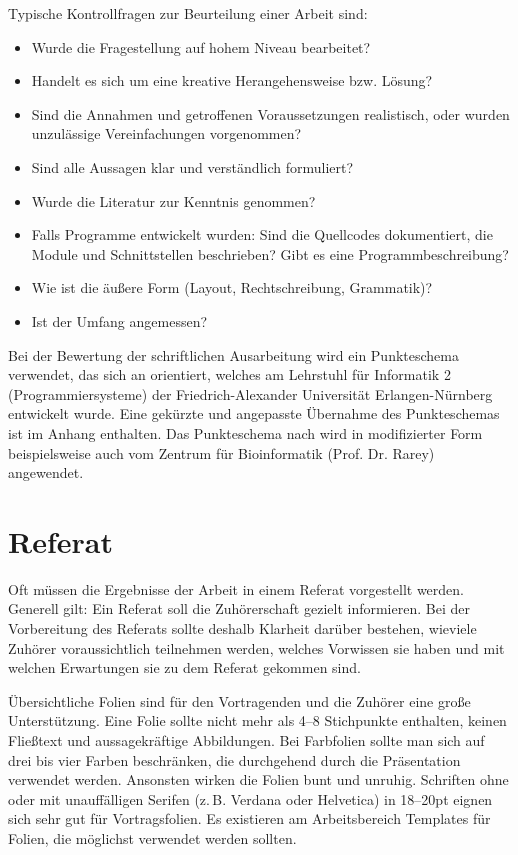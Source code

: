 \documentclass[
    fontsize=12pt,
    headings=small,
    parskip=half,           %
    bibliography=totoc,
    numbers=noenddot,       %
    open=any,               %
    ]{scrreprt}
\begin{document}
Typische Kontrollfragen zur Beurteilung einer Arbeit sind:
\begin{itemize}
	\item Wurde die Fragestellung auf hohem Niveau bearbeitet?
	\item Handelt es sich um eine kreative Herangehensweise bzw. Lösung?
	\item Sind die Annahmen und getroffenen Voraussetzungen realistisch, oder wurden unzulässige Vereinfachungen vorgenommen?
	\item Sind alle Aussagen klar und verständlich formuliert?
	\item Wurde die Literatur zur Kenntnis genommen?
	\item Falls Programme entwickelt wurden: Sind die Quellcodes dokumentiert, die Module und Schnittstellen beschrieben? Gibt es eine Programmbeschreibung?
	\item Wie ist die äußere Form (Layout, Rechtschreibung, Grammatik)?
	\item Ist der Umfang angemessen?
\end{itemize}

Bei der Bewertung der schriftlichen Ausarbeitung wird ein Punkteschema verwendet, das sich an \cite{faui2} orientiert, welches am Lehrstuhl für Informatik 2 (Programmiersysteme) der Friedrich-Alexander Universität Erlangen-Nürnberg entwickelt wurde. Eine gekürzte und angepasste Übernahme des Punkteschemas ist im Anhang enthalten. Das Punkteschema nach \cite{faui2} wird in modifizierter Form beispielsweise auch vom Zentrum für Bioinformatik (Prof. Dr. Rarey) angewendet.

\section{Referat}

Oft müssen die Ergebnisse der Arbeit in einem Referat vorgestellt werden. Generell gilt: Ein Referat soll die Zuhörerschaft gezielt informieren. Bei der Vorbereitung des Referats sollte deshalb Klarheit darüber bestehen, wieviele Zuhörer voraussichtlich teilnehmen werden, welches Vorwissen sie haben und mit welchen Erwartungen sie zu dem Referat gekommen sind.

Übersichtliche Folien sind für den Vortragenden und die Zuhörer eine große Unterstützung. Eine Folie sollte nicht mehr als 4--8 Stichpunkte enthalten, keinen Fließtext und aussagekräftige Abbildungen. Bei Farbfolien sollte man sich auf drei bis vier Farben beschränken, die durchgehend durch die Präsentation verwendet werden. Ansonsten wirken die Folien bunt und unruhig. Schriften ohne oder mit unauffälligen Serifen (z.\,B. Verdana oder Helvetica) in 18--20pt eignen sich sehr gut für Vortragsfolien. Es existieren am Arbeitsbereich Templates für Folien, die möglichst verwendet werden sollten.
\end{document}
